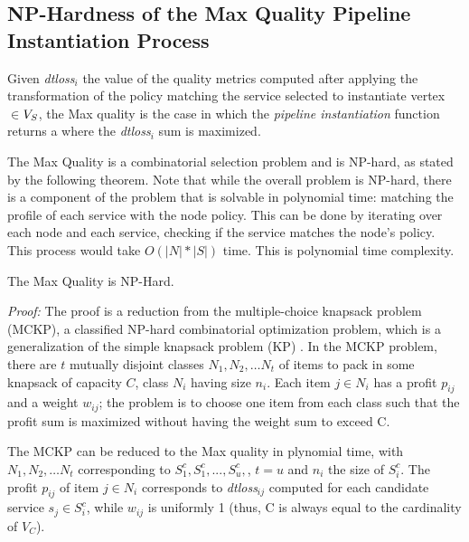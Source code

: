 \subsection{NP-Hardness of the Max Quality Pipeline Instantiation Process}\label{sec:nphard}

 \begin{definition}\label{def:MaXQualityInstance}
Given \textit{dtloss}$_i$ the value of the quality metrics computed after applying the transformation of the policy matching the service selected to instantiate vertex  $\in$$V_S$, the Max quality \problem is the case in which the \emph{pipeline instantiation} function returns a \pipelineInstance where the \textit{dtloss}$_i$ sum is maximized.
\end{definition}
 
The Max Quality \problem is a combinatorial selection problem and is NP-hard, as stated by the following theorem.
Note that while the overall problem is NP-hard, there is a component of the problem that is solvable in polynomial time: matching the profile of each service with the node policy. This can be done by iterating over each node and each service, checking if the service matches the node’s policy. This process would take $O(|N|*|S|)$ time. This is polynomial time complexity.

\begin{theorem}
  The Max Quality  \problem is NP-Hard.
\end{theorem}
\emph{Proof: } 
The proof is a reduction from the multiple-choice knapsack problem (MCKP), a classified NP-hard combinatorial optimization problem, which is a generalization of the simple knapsack problem (KP) \cite{}. In the MCKP problem, there are $t$ mutually disjoint classes $N_1,N_2,…N_t$ of items to pack in some knapsack of capacity $C$, class $N_i$ having size $n_i$. Each item $j \in N_i$ has a profit $p_{ij}$ and a weight $w_{ij}$; the problem is to choose one item from each class such that the profit sum is maximized without having the weight sum to exceed C. 

The MCKP can be reduced to the Max quality \problem in plynomial time, with $N_1,N_2,…N_t$ corresponding to $S^c_{1}, S^c_{1}, ..., S^c_{u},$, $t=u$ and $n_i$ the size of $S^c_{i}$. The profit $p_{ij}$ of item $j \in N_i$ corresponds to \textit{dtloss}$_{ij}$ computed for each candidate service $s_j \in S^c_{i}$, while $w_{ij}$ is uniformly 1 (thus, C is always equal to the cardinality of $V_C$).


